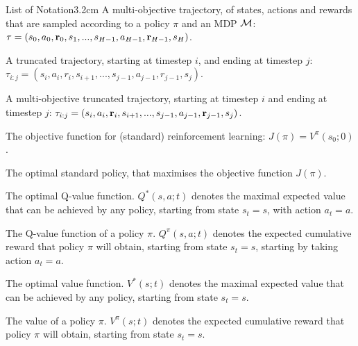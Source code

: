 \begin{mclistof}{List of Notation}{3.2cm}
        A multi-objective trajectory, of states, actions and rewards that are sampled according to a policy $\pi$ and an MDP $\mathcal{M}$: $\mathbf{\tau} = (s_0, a_0, \mathbf{r}_0, s_1, ..., s_{H-1}, a_{H-1}, \mathbf{r}_{H-1}, s_H)$.
    \item[$\tau_{i:j}$]
        A truncated trajectory, starting at timestep $i$, and ending at timestep $j$: $\tau_{i:j} = (s_i, a_i, r_i, s_{i+1}, ..., s_{j-1}, a_{j-1}, r_{j-1}, s_j)$. 
    \item[$\bff{\tau}_{i:j}$] 
        A multi-objective truncated trajectory, starting at timestep $i$ and ending at timestep $j$: $\mathbf{\tau}_{i:j} = (s_i, a_i, \mathbf{r}_i, s_{i+1}, ..., s_{j-1}, a_{j-1}, \mathbf{r}_{j-1}, s_j)$.
    \\
    \item[{\parbox[t]{\textwidth}{
            \Large\textbf{Reinforcement Learning (Section \ref{sec:2-3-rl})}\hfill\hfill
          }}]
    \item[$J(\pi)$] 
        The objective function for (standard) reinforcement learning: $J(\pi) = V^{\pi}(s_0;0)$.
    \item[$\pi^*$]
        The optimal standard policy, that maximises the objective function $J(\pi)$.
    \item[$Q^*$]
        The optimal Q-value function. $Q^*(s,a;t)$ denotes the maximal expected value that can be achieved by any policy, starting from state $s_t=s$, with action $a_t=a$.
    \item[$Q^{\pi}$]
        The Q-value function of a policy $\pi$. $Q^{\pi}(s,a;t)$ denotes the expected cumulative reward that policy $\pi$ will obtain, starting from state $s_t=s$, starting by taking action $a_t=a$.
    \item[$V^*$]
        The optimal value function. $V^*(s;t)$ denotes the maximal expected value that can be achieved by any policy, starting from state $s_t=s$.
    \item[$V^{\pi}$]
        The value of a policy $\pi$. $V^{\pi}(s;t)$ denotes the expected cumulative reward that policy $\pi$ will obtain, starting from state $s_t=s$.

\end{mclistof}
